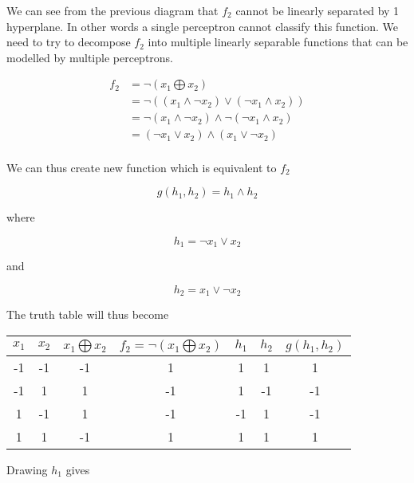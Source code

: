 \documentclass[10pt,a4paper]{article}
\begin{document}
We can see from the previous diagram that $f_2$ cannot be linearly separated by 1 hyperplane. In other words a single perceptron cannot classify this function. We need to try to decompose $f_2$ into multiple linearly separable functions that can be modelled by multiple perceptrons.

\begin{equation}
\begin{split}
f_2 &= \neg ( x_1 \bigoplus x_2 ) \\
    &= \neg( (x_1 \wedge \neg x_2) \vee (\neg x_1 \wedge x_2))\\
    &= \neg(x_1\wedge \neg x_2) \wedge \neg(\neg x_1 \wedge x_2)\\
    &= (\neg x_1 \vee x_2) \wedge (x_1 \vee \neg x_2)\\
\end{split}
\end{equation}  

We can thus create new function which is equivalent to $f_2$

\begin{equation}
g(h_1,h_2) = h_1 \wedge h_2 
\end{equation} 

where 

\begin{equation}
h_1 = \neg x_1 \vee x_2
\end{equation}

and 

\begin{equation}
h_2 = x_1 \vee \neg x_2
\end{equation}

The truth table will thus become

\begin{tabular}{|c|c|c|c|c|c|c|}
\hline
$x_1$ & $x_2$ & $x_1 \bigoplus x_2$ & $f_2 =\neg (x_1 \bigoplus x_2)$ & $h_1$ & $h_2$ &$g(h_1,h_2)$\\
\hline
-1 &-1 &-1 & 1 & 1 & 1 & 1  \\
-1 & 1 & 1 &-1 & 1 &-1 & -1 \\
 1 &-1 & 1 &-1 &-1 & 1 & -1 \\
 1 & 1 &-1 & 1 & 1 & 1 & 1  \\
\hline
\end{tabular}

Drawing $h_1$ gives
\end{document}
